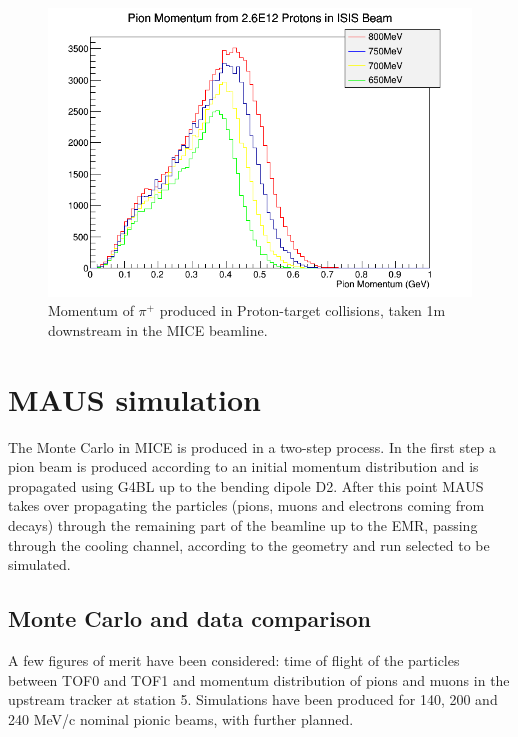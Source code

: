 \documentclass[a4paper,11pt]{article}
\begin{document}
\begin{figure}[b!]
  \begin{center}
    \includegraphics[width=1.0\columnwidth]{./figures/PiPlusMomentum650+700+750+800MeV2.png}
    \caption{Momentum of $\pi^{+}$ produced in Proton-target collisions, taken 1m downstream in the MICE beamline.}
    \label{fig:PiMomentum}
  \end{center}
\end{figure}

\pagebreak

\section{MAUS simulation}

The Monte Carlo in MICE is produced in a two-step process. In the first step a pion beam is produced according to an initial momentum distribution and is propagated using G4BL up to the bending dipole D2. After this point MAUS takes over propagating the particles (pions, muons and electrons coming from decays) through the remaining part of the beamline up to the EMR, passing through the cooling channel, according to the geometry and run selected to be simulated. 

\subsection{Monte Carlo and data comparison}

A few figures of merit have been considered: time of flight of the particles between TOF0 and TOF1 and momentum distribution of pions and muons in the upstream tracker at station 5.
Simulations have been produced for 140, 200 and 240 MeV/c nominal pionic beams, with further planned.  
\end{document}
